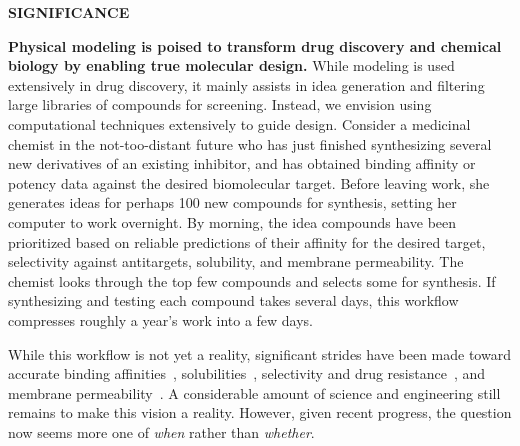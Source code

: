 \documentclass[11pt]{article}
\begin{document}




{\Large \bf SIGNIFICANCE}


\textbf{Physical modeling is poised to transform drug discovery and chemical biology by enabling true molecular design.}
While modeling is used extensively in drug discovery, it mainly assists in idea generation and filtering large libraries of compounds for screening. 
Instead, we envision using computational techniques extensively to guide design. 
Consider a medicinal chemist in the not-too-distant future who has just finished synthesizing several new derivatives of an existing inhibitor, and has obtained binding affinity or potency data against the desired biomolecular target. 
Before leaving work, she generates ideas for perhaps 100 new compounds for synthesis, setting her computer to work overnight. 
By morning, the idea compounds have been prioritized based on reliable predictions of their affinity for the desired target, selectivity against antitargets, solubility, and membrane permeability.  
The chemist looks through the top few compounds and selects some for synthesis. 
If synthesizing and testing each compound takes several days, this workflow compresses roughly a year's work into a few days.

While this workflow is not yet a reality, significant strides have been made toward accurate binding affinities~\cite{mobley_perspective_2012, christ_accuracy_2014, deng_distinguishing_2015, Sherborne:2016:JComputAidedMolDes, schrodinger_accurate_2015, christ_binding_2016, cui_affinity_2016, verras_free_2016, Aldeghi:2017:J.Am.Chem.Soc.}, solubilities~\cite{Schnieders:2012:J.Chem.TheoryComput., park_absolute_2014, liu_using_2016}, selectivity and drug resistance~\cite{leonis_contribution_2013, Aldeghi:2017:J.Am.Chem.Soc.}, and membrane permeability~\cite{lee_permeability_2016, comer_permeability_2014}. 
A considerable amount of science and engineering still remains to make this vision a reality.
However, given recent progress, the question now seems more one of \emph{when} rather than \emph{whether}.
\end{document}
